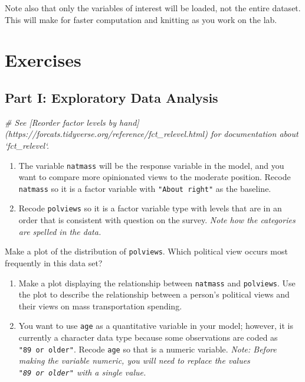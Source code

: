 \documentclass[]{book}
\newenvironment{Shaded}{\begin{snugshade}}{\end{snugshade}}
\newcommand{\CommentTok}[1]{\textcolor[rgb]{0.56,0.35,0.01}{\textit{#1}}}
\begin{document}
Note also that only the variables of interest will be loaded, not the
entire dataset. This will make for faster computation and knitting as
you work on the lab.

\section{Exercises}\label{exercises-7}

\subsection{Part I: Exploratory Data
Analysis}\label{part-i-exploratory-data-analysis}

\begin{Shaded}
\begin{Highlighting}[]
\CommentTok{# See [Reorder factor levels by hand](https://forcats.tidyverse.org/reference/fct_relevel.html) for documentation about `fct_relevel`.}
\end{Highlighting}
\end{Shaded}

\begin{enumerate}
\def\labelenumi{\arabic{enumi}.}
\item
  The variable \texttt{natmass} will be the response variable in the
  model, and you want to compare more opinionated views to the moderate
  position. Recode \texttt{natmass} so it is a factor variable with
  \texttt{"About\ right"} as the baseline.
\item
  Recode \texttt{polviews} so it is a factor variable type with levels
  that are in an order that is consistent with question on the survey.
  \emph{Note how the categories are spelled in the data.}
\end{enumerate}

Make a plot of the distribution of \texttt{polviews}. Which political
view occurs most frequently in this data set?

\begin{enumerate}
\def\labelenumi{\arabic{enumi}.}
\setcounter{enumi}{2}
\item
  Make a plot displaying the relationship between \texttt{natmass} and
  \texttt{polviews}. Use the plot to describe the relationship between a
  person's political views and their views on mass transportation
  spending.
\item
  You want to use \texttt{age} as a quantitative variable in your model;
  however, it is currently a character data type because some
  observations are coded as \texttt{"89\ or\ older"}. Recode
  \texttt{age} so that is a numeric variable. \emph{Note: Before making
  the variable numeric, you will need to replace the values
  \texttt{"89\ or\ older"} with a single value.}
\end{enumerate}
\end{document}

